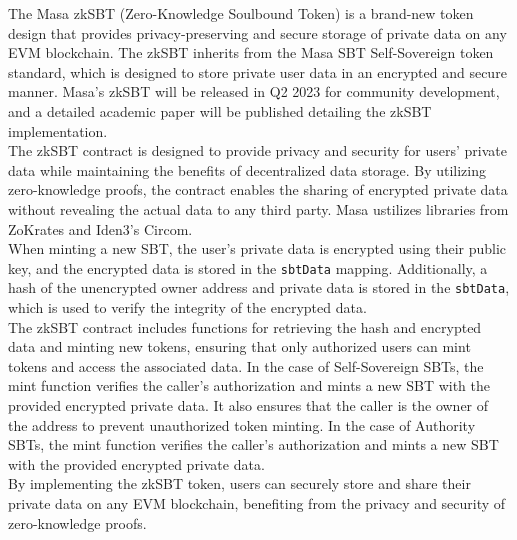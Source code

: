 \documentclass{article}
\begin{document}
The Masa zkSBT (Zero-Knowledge Soulbound Token)\cite{zksbt} is a brand-new token design that provides privacy-preserving and secure storage of private data on any EVM blockchain. The zkSBT inherits from the Masa SBT Self-Sovereign token standard, which is designed to store private user data in an encrypted and secure manner. Masa’s zkSBT will be released in Q2 2023 for community development, and a detailed academic paper will be published detailing the zkSBT implementation.
\\
\newline
The zkSBT contract is designed to provide privacy and security for users' private data while maintaining the benefits of decentralized data storage. By utilizing zero-knowledge proofs, the contract enables the sharing of encrypted private data without revealing the actual data to any third party\cite{linkingsouls}. Masa ustilizes libraries from ZoKrates\cite{zokrates} and Iden3’s Circom\cite{circom}.
\\
\newline
When minting a new SBT, the user's private data is encrypted using their public key, and the encrypted data is stored in the \texttt{sbtData} mapping. Additionally, a hash of the unencrypted owner address and private data is stored in the \texttt{sbtData}, which is used to verify the integrity of the encrypted data.
\\
\newline
The zkSBT contract includes functions for retrieving the hash and encrypted data and minting new tokens, ensuring that only authorized users can mint tokens and access the associated data. In the case of Self-Sovereign SBTs, the mint function verifies the caller's authorization and mints a new SBT with the provided encrypted private data. It also ensures that the caller is the owner of the address to prevent unauthorized token minting. In the case of Authority SBTs, the mint function verifies the caller’s authorization and mints a new SBT with the provided encrypted private data. 
\\
\newline
By implementing the zkSBT token, users can securely store and share their private data on any EVM blockchain, benefiting from the privacy and security of zero-knowledge proofs.
\end{document}
